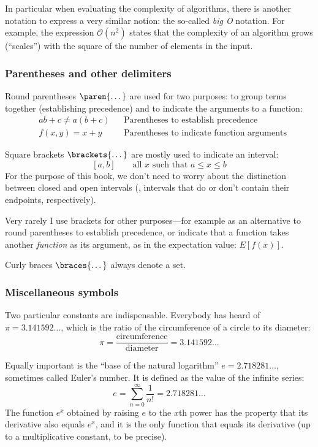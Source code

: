 In particular when evaluating the complexity of algorithms, there is
another notation to express a very similar notion: the so-called
\emph{big O} notation. For example, the expression $\mathcal{O}(n^2)$
states that the complexity of an algorithm grows (``scales'') with the
square of the number of elements in the input.

\subsubsection{Parentheses and other delimiters}


Round parentheses $\paren{\dots}$ are used for two purposes: to group
terms together (establishing precedence) and to indicate the arguments
to a function: 
%
\begin{align*}
& a b + c \ne a (b + c) & & \text{Parentheses to establish precedence} \\
& f(x,y) = x + y        & & \text{Parentheses to indicate function arguments}
\end{align*}
%

Square brackets $\brackets{\dots}$ are mostly used to indicate an
interval:
%
\[
[a,b] \qquad \text{all $x$ such that $a \le x \le b$}
\]
%
For the purpose of this book, we don't need to worry about the
distinction between closed and open intervals (\ie, intervals that do
or don't contain their endpoints, respectively).

Very rarely I use brackets for other purposes---for example as an
alternative to round parentheses to establish precedence, or indicate
that a function takes another \emph{function} as its argument, as in
the expectation value: $E[ f(x) ]$.

Curly braces $\braces{\dots}$ always denote a set.


\subsubsection{Miscellaneous symbols}

Two particular constants are indispensable.  Everybody has heard of
$\pi = 3.141592\dots$, which is the ratio of the circumference of a
circle to its diameter:
%
\[
\pi = \frac{\text{circumference}}{\text{diameter}} = 3.141592\dots
\]

Equally important is the ``base of the natural logarithm'' $e =
2.718281\dots$, sometimes called Euler's number. It is defined as the
value of the infinite series:
%
\[
e = \sum_{n=0}^\infty \frac{1}{n!} = 2.718281\dots
\]
%
The function $e^x$ obtained by raising $e$ to the $x$th power has the
property that its derivative also equals $e^x$, and it is the only
function that equals its derivative (up to a multiplicative constant,
to be precise).

